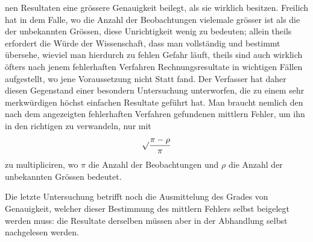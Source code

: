 %
nen Resultaten eine grössere Genauigkeit beilegt, als sie wirklich besitzen. Freilich hat in dem Falle, wo die Anzahl der Beobachtungen vielemale grösser ist als die der unbekannten Grössen, diese Unrichtigkeit wenig zu bedeuten; allein theils erfordert die Würde der Wissenschaft, dass man vollständig und bestimmt übersehe, wieviel man hierdurch zu fehlen Gefahr läuft, theils sind auch wirklich öfters nach jenem fehlerhaften Verfahren Rechnungsresultate in wichtigen Fällen aufgestellt, wo jene Voraussetzung nicht Statt fand. Der Verfasser hat daher diesen Gegenstand einer besondern Untersuchung unterworfen, die zu einem sehr merkwürdigen höchst einfachen Resultate geführt hat. Man braucht nemlich den nach dem angezeigten fehlerhaften Verfahren gefundenen mittlern Fehler, um ihn in den richtigen zu verwandeln, nur mit
\[
\surd\frac{\pi-\rho}{\pi}
\]
zu multipliciren, wo \(\pi\) die Anzahl der Beobachtungen und \(\rho\) die Anzahl der unbekannten Grössen bedeutet.

Die letzte Untersuchung betrifft noch die Ausmittelung des Grades von Genauigkeit, welcher dieser Bestimmung des mittlern Fehlers selbst beigelegt werden muss: die Resultate derselben müssen aber in der Abhandlung selbst nachgelesen werden.

